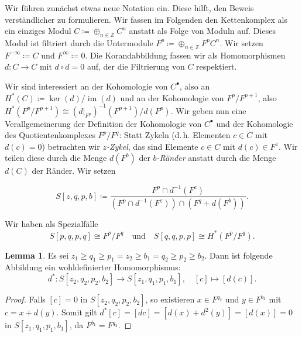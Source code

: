 \documentclass[11pt, a4paper, german]{article}
\theoremstyle{definition}
\newtheorem{lem}{Lemma}
\theoremstyle{remark}
\newcommand{\Z}{\mathbb{Z}} %
\DeclareMathOperator{\im}{im} %
\newcommand{\ES}{Es sei} %
\renewcommand{\dh}{d.\,h.} %
\begin{document}
Wir führen zunächst etwas neue Notation ein.
Diese hilft, den Beweis verständlicher zu formulieren.
Wir fassen im Folgenden den Kettenkomplex als ein einziges Modul $C \coloneqq \oplus_{n \in \Z} C^n$ anstatt als Folge von Moduln auf.
Dieses Modul ist filtriert durch die Untermodule $F^p \coloneqq \oplus_{n \in \Z} F^p C^n$.
Wir setzen $F^{-\infty} \coloneqq C$ und $F^{\infty} \coloneqq 0$.
Die Korandabbildung fassen wir als Homomorphismen $d : C \to C$ mit $d \circ d = 0$ auf, der die Filtrierung von $C$ respektiert.

Wir sind interessiert an der Kohomologie von $C^\bullet$, also an $H^*(C) \coloneqq \ker(d) / \im(d)$ und an der Kohomologie von $F^p / F^{p+1}$, also $H^*(F^p / F^{p+1}) \cong (d|_{F^p})^{-1}(F^{p+1}) / d(F^p)$.
Wir geben nun eine Verallgemeinerung der Definition der Kohomologie von $C^\bullet$ und der Kohomologie des Quotientenkomplexes $F^p / F^q$: Statt Zykeln (\dh{} Elementen $c \in C$ mit $d(c) = 0$) betrachten wir \emph{$z$-Zykel}, das sind Elemente $c \in C$ mit $d(c) \in F^z$. Wir teilen diese durch die Menge $d(F^b)$ der \emph{$b$-Ränder} anstatt durch die Menge $d(C)$ der Ränder. Wir setzen

\[ S[z, q, p, b] \coloneqq \frac{F^p \cap d^{-1}(F^z)}{(F^p \cap d^{-1}(F^z)) \cap (F^q + d(F ^b))}. \]


Wir haben als Spezialfälle
\[
  S[p,q,p,q] \cong F^p / F^q
  \quad \text{und} \quad
  S[q,q,p,p] \cong H^*(F^p / F^q).
\]

\begin{lem}\label{differential-homomorphism}
  \ES{} $z_1 \geq q_1 \geq p_1 = z_2 \geq b_1 = q_2 \geq p_2 \geq b_2$.
  Dann ist folgende Abbildung ein wohldefinierter Homomorphismus:
  \[
    d^* : S[z_2, q_2, p_2, b_2] \to S[z_1, q_1, p_1, b_1], \quad
    [c] \mapsto [d(c)].
  \]
\end{lem}

\begin{proof}
  Falls $[c] = 0$ in $S[z_2, q_2, p_2, b_2]$, so existieren $x \in F^{q_2}$ und $y \in F^{b_2}$ mit $c = x + d(y)$. Somit gilt $d^*[c] = [dc] = [d(x) + d^2(y)] = [d(x)] = 0$ in $S[z_1, q_1, p_1, b_1]$, da $F^{b_1} = F^{q_2}$.
\end{proof}
\end{document}
